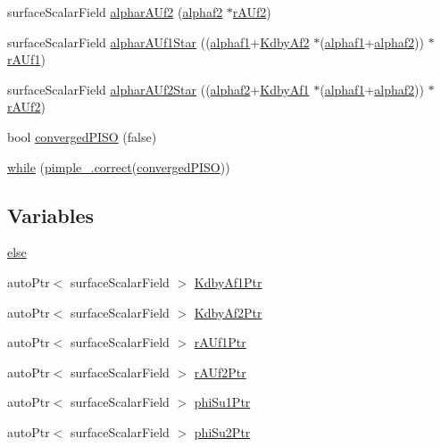 \begin{DoxyCompactItemize}
\item 
surface\+Scalar\+Field \hyperlink{pEqnf__2p_8H_a6ec0d21d609168975080be8ab17fffec}{alphar\+A\+Uf2} (\hyperlink{refsAndControls__2p_8H_afc54ce6b2d45999d802074c7c4d86cc8}{alphaf2} $\ast$\hyperlink{pEqnf__2p_8H_af4fa7f5a39d79ab8eb0a15cec0eb266a}{r\+A\+Uf2})
\item 
surface\+Scalar\+Field \hyperlink{pEqnf__2p_8H_acc1c5015cd091fa1405bfe2def838914}{alphar\+A\+Uf1\+Star} ((\hyperlink{refsAndControls__2p_8H_af5ff2b878e8d79c2bd7cf5385f55ea99}{alphaf1}+\hyperlink{pEqnf__2p_8H_ab7a4fc4ee3f50aa316a32f9fe8a69e55}{Kdby\+Af2} $\ast$(\hyperlink{refsAndControls__2p_8H_af5ff2b878e8d79c2bd7cf5385f55ea99}{alphaf1}+\hyperlink{refsAndControls__2p_8H_afc54ce6b2d45999d802074c7c4d86cc8}{alphaf2})) $\ast$\hyperlink{pEqnf__2p_8H_afe937f556d00eb62aa6152533edebec5}{r\+A\+Uf1})
\item 
surface\+Scalar\+Field \hyperlink{pEqnf__2p_8H_a0556af18bc3855bf335f1763fd2a0814}{alphar\+A\+Uf2\+Star} ((\hyperlink{refsAndControls__2p_8H_afc54ce6b2d45999d802074c7c4d86cc8}{alphaf2}+\hyperlink{pEqnf__2p_8H_a17310029adb03eb9492c209804d89f41}{Kdby\+Af1} $\ast$(\hyperlink{refsAndControls__2p_8H_af5ff2b878e8d79c2bd7cf5385f55ea99}{alphaf1}+\hyperlink{refsAndControls__2p_8H_afc54ce6b2d45999d802074c7c4d86cc8}{alphaf2})) $\ast$\hyperlink{pEqnf__2p_8H_af4fa7f5a39d79ab8eb0a15cec0eb266a}{r\+A\+Uf2})
\item 
bool \hyperlink{pEqnf__2p_8H_a7378b3cca14609b2f41dab30069eb9c4}{converged\+P\+I\+SO} (false)
\item 
\hyperlink{pEqnf__2p_8H_a6e6ddb24845d3c5c3906e45d968e9448}{while} (\hyperlink{hEqn_8H_a3a2458f7f54158be848527a3fdedd5dd}{pimple\+\_\+.\+correct}(\hyperlink{pEqnf__2p_8H_a7378b3cca14609b2f41dab30069eb9c4}{converged\+P\+I\+SO}))
\end{DoxyCompactItemize}
\subsection*{Variables}
\begin{DoxyCompactItemize}
\item 
\hyperlink{pEqnf__2p_8H_a0544c3fe466e421738dae463968b70ba}{else}
\item 
auto\+Ptr$<$ surface\+Scalar\+Field $>$ \hyperlink{pEqnf__2p_8H_ab519c6d0ec326c4166a5238ad1a75281}{Kdby\+Af1\+Ptr}
\item 
auto\+Ptr$<$ surface\+Scalar\+Field $>$ \hyperlink{pEqnf__2p_8H_a2ada986b644f6ca4d3739c7cd72db448}{Kdby\+Af2\+Ptr}
\item 
auto\+Ptr$<$ surface\+Scalar\+Field $>$ \hyperlink{pEqnf__2p_8H_a45cd567de66687731018bd57ba4895b4}{r\+A\+Uf1\+Ptr}
\item 
auto\+Ptr$<$ surface\+Scalar\+Field $>$ \hyperlink{pEqnf__2p_8H_afd2f9cb3bfb4ff4a3ca384fedd285ec9}{r\+A\+Uf2\+Ptr}
\item 
auto\+Ptr$<$ surface\+Scalar\+Field $>$ \hyperlink{pEqnf__2p_8H_a9c2f51a5677c963fe409e991f6487325}{phi\+Su1\+Ptr}
\item 
auto\+Ptr$<$ surface\+Scalar\+Field $>$ \hyperlink{pEqnf__2p_8H_af80a3d86e3c14c6ac34eee295647f041}{phi\+Su2\+Ptr}
\end{DoxyCompactItemize}


